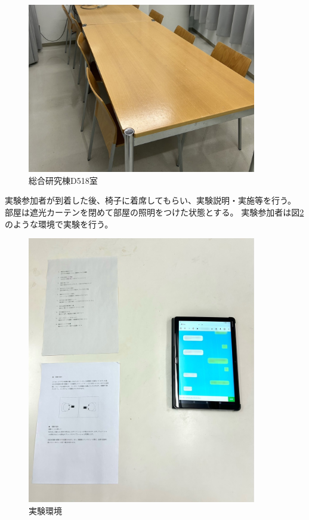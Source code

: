 \documentclass[11pt,a4paper]{ltjsreport}
\begin{document}
\begin{figure}[htbp]
    \begin{center}
        \includegraphics[width=100mm]{PDF/D518.jpg}
        \caption{総合研究棟D518室}
        \label{figure:D518}
    \end{center}
\end{figure}

実験参加者が到着した後、椅子に着席してもらい、実験説明・実施等を行う。
部屋は遮光カーテンを閉めて部屋の照明をつけた状態とする。
実験参加者は図\ref{figure:zikke_kankyo}のような環境で実験を行う。

\begin{figure}[htbp]
    \begin{center}
        \includegraphics[width=100mm]{PDF/zikke_kankyo.jpg}
        \caption{実験環境}
        \label{figure:zikke_kankyo}
    \end{center}
\end{figure}
\end{document}
